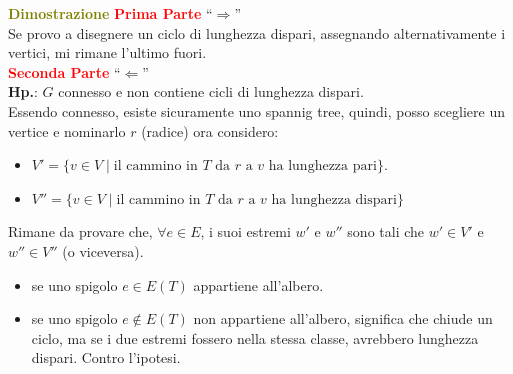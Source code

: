 \begin{flushleft}
    \begin{boxA}
        \textcolor{olive}{\textbf{Dimostrazione}} \newline
        \textcolor{red}{\textbf{Prima Parte}} ``$\Rightarrow$'' \\
        Se provo a disegnere un ciclo di lunghezza dispari, assegnando alternativamente i vertici, mi rimane l'ultimo fuori. \\
        \textcolor{red}{\textbf{Seconda Parte}} ``$\Leftarrow$'' \\
        \textbf{Hp.}: $G$ connesso e non contiene cicli di lunghezza dispari. \\
        Essendo connesso, esiste sicuramente uno spannig tree, quindi, posso scegliere un vertice e nominarlo $r$ (radice) ora considero:
        \begin{itemize}[nosep]
            \item $V' = \{v \in V \; | \; \text{il cammino in } T \text{ da } r \text{ a } v \text{ ha lunghezza pari}\}$.
            \item $V'' = \{v \in V \; | \; \text{il cammino in } T \text{ da } r \text{ a } v \text{ ha lunghezza dispari}\}$
        \end{itemize}
        Rimane da provare che, $\forall e \in E$, i suoi estremi $w'$ e $w''$ sono tali che $w' \in V'$ e $w'' \in V''$ (o viceversa).
        \begin{itemize}[nosep]
            \item se uno spigolo $e \in E(T)$ appartiene all'albero.
            \item se uno spigolo $e \not\in E(T)$ non appartiene all'albero, significa che chiude un ciclo, ma se i due estremi fossero nella stessa classe, avrebbero lunghezza dispari. Contro l'ipotesi.
        \end{itemize}
    \end{boxA}
\end{flushleft}

\newpage
